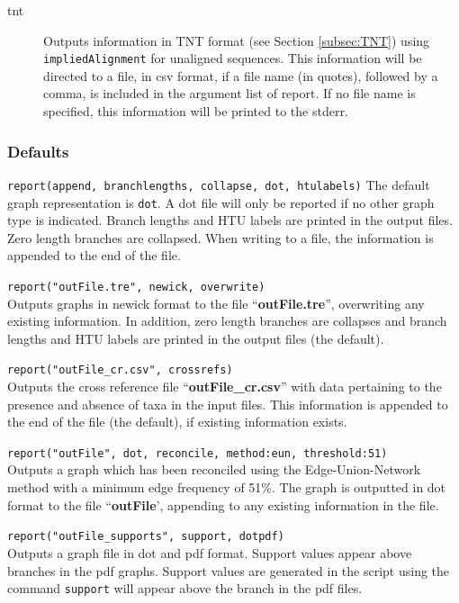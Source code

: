\begin{description}
		\item[tnt] Outputs information in TNT \citep{Goloboffetal2008} format (see 
		Section \ref{subsec:TNT}) using \texttt{impliedAlignment} for unaligned 
		sequences. This information will be directed to a file, in csv format, if a file 
		name (in quotes), followed by a comma, is included in the argument list of 
		report. If no file name is specified, this information will be printed to the stderr.
				 
	\end{description}			
		
	\subsubsection{Defaults}
		\texttt{report(append, branchlengths, collapse, dot, htulabels)}
		The default graph representation is \texttt{dot}. A dot file will only be 
		reported if no other graph type is indicated. Branch lengths and HTU 
		labels are printed in the output files. Zero length branches are collapsed. 
		When writing to a file, the information is appended to the end of the file. 
		
	\begin{example}
	
		\item{\texttt{report("outFile.tre", newick, overwrite)}\\ Outputs graphs in newick 
		format to the file ``\textbf{outFile.tre}'', overwriting any existing information.
		In addition, zero length branches are collapses and branch lengths and HTU 
		labels are printed in the output files (the default).}
		
		\item{\texttt{report("outFile\_cr.csv", crossrefs)}\\ Outputs the cross reference file 
		``\textbf{outFile\_cr.csv}'' with data pertaining to the presence and absence of 
		taxa in the input files. This information is appended to the end of the file (the 
		default), if existing information exists.}
		
		\item{\texttt{report("outFile", dot, reconcile, method:eun, threshold:51)}\\ Outputs a
		graph which has been reconciled using the Edge-Union-Network method with a 
		minimum edge frequency of 51\%. The graph is outputted in dot format to the 
		file ``\textbf{outFile}', appending to any existing information in the file.}
		
		\item{\texttt{report("outFile\_supports", support, dotpdf)}\\ Outputs a graph file in 
		dot and pdf format. Support values appear above branches in the pdf graphs.
		Support values are generated in the script using the command \texttt{support}
		will appear above the branch in the pdf files.}
		
	\end{example}
		
